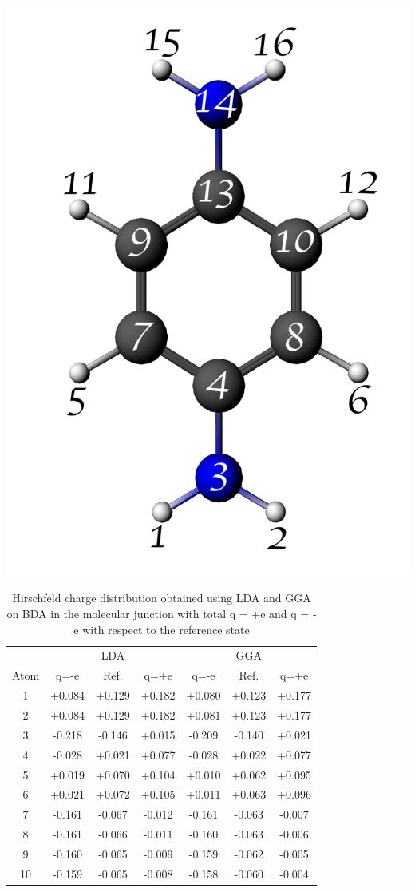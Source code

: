 \documentclass[aip,jcp,a4paper,reprint,floatfix,superscriptaddress]{revtex4-1}
\begin{document}
\begin{table}
\caption{Hirschfeld charge distribution obtained using LDA and GGA on BDA in the molecular junction with total q = +e and q = -e with respect to the reference state}\label{tab:charges}
\includegraphics[width=0.5\columnwidth]{img.exp/Fragment-geoms/nums-molecule.png} 
\scriptsize{
\begin{tabular}{c|ccc|ccc}
\hline\hline
  & \multicolumn{1}{c}{} & \multicolumn{1}{c}{LDA} & \multicolumn{1}{c|}{}
  & \multicolumn{1}{c}{} & \multicolumn{1}{c}{GGA} \\[1pt] \cline{2-7}
 Atom & q=-e & Ref. & q=+e & q=-e & Ref. & q=+e \\ \cline{1-7}
 1   & +0.084 & +0.129 & +0.182 & +0.080 & +0.123 & +0.177 \\ 
 2   & +0.084 & +0.129 & +0.182 & +0.081 & +0.123 & +0.177 \\ 
 3   & -0.218 & -0.146 & +0.015 & -0.209 & -0.140 & +0.021 \\ 
 4   & -0.028 & +0.021 & +0.077 & -0.028 & +0.022 & +0.077 \\ 
 5   & +0.019 & +0.070 & +0.104 & +0.010 & +0.062 & +0.095 \\ 
 6   & +0.021 & +0.072 & +0.105 & +0.011 & +0.063 & +0.096 \\ 
 7   & -0.161 & -0.067 & -0.012 & -0.161 & -0.063 & -0.007 \\ 
 8   & -0.161 & -0.066 & -0.011 & -0.160 & -0.063 & -0.006 \\ 
 9   & -0.160 & -0.065 & -0.009 & -0.159 & -0.062 & -0.005 \\ 
 10 & -0.159 & -0.065 & -0.008 & -0.158 & -0.060 & -0.004 \\ 

\end{tabular}}
\end{table}
\end{document}
